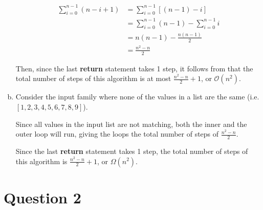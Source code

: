 \documentclass[12pt]{article}
\begin{document}
\begin{enumerate}[a.]
\begin{tcolorbox}
        \begin{align}
            \sum\limits_{i=0}^{n-1} (n - i + 1) &= \sum\limits_{i=0}^{n-1} \left[ (n-1) - i \right]\\
            &= \sum\limits_{i=0}^{n-1} (n-1) - \sum\limits_{i=0}^{n-1} i\\
            &= n(n-1) - \frac{n(n-1)}{2}\\
            &= \frac{n^2-n}{2}
        \end{align}

        \bigskip

        Then, since the last \textbf{return} statement takes 1 step, it follows
        from that the total number of steps of this algorithm is at most
        $\frac{n^2-n}{2} + 1$, or $\mathcal{O}(n^2)$.
    \end{tcolorbox}

    \item

    Consider the input family where none of the values in a list are the same
    (i.e. $[1,2,3,4,5,6,7,8,9]$).

    \bigskip

    Since all values in the input list are not matching, both the inner and
    the outer loop will run, giving the loops the total number of steps
    of $\frac{n^2-n}{2}$.

    \bigskip

    Since the last \textbf{return} statement takes 1 step, the total number of
    steps of this algorithm is $\frac{n^2-n}{2} + 1$, or $\Omega(n^2)$.

\end{enumerate}

\section*{Question 2}
\end{document}
